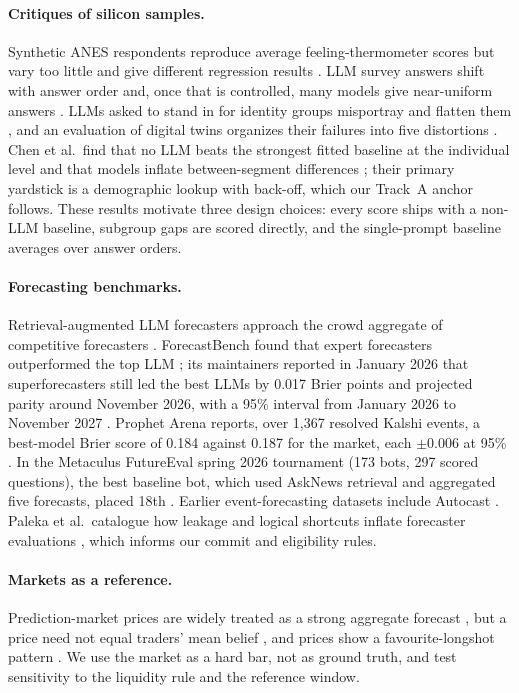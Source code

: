 \documentclass[11pt]{article}
\begin{document}
\paragraph{Critiques of silicon samples.} Synthetic ANES respondents reproduce average feeling-thermometer scores but vary too little and give different regression results \citep{bisbee2024synthetic}. LLM survey answers shift with answer order and, once that is controlled, many models give near-uniform answers \citep{dominguezolmedo2023questioning}. LLMs asked to stand in for identity groups misportray and flatten them \citep{wang2025flatten}, and an evaluation of digital twins organizes their failures into five distortions \citep{peng2025funhouse}. Chen et al.\ find that no LLM beats the strongest fitted baseline at the individual level and that models inflate between-segment differences \citep{chen2026synthetic}; their primary yardstick is a demographic lookup with back-off, which our Track~A anchor follows. These results motivate three design choices: every score ships with a non-LLM baseline, subgroup gaps are scored directly, and the single-prompt baseline averages over answer orders.

\paragraph{Forecasting benchmarks.} Retrieval-augmented LLM forecasters approach the crowd aggregate of competitive forecasters \citep{halawi2024approaching}. ForecastBench found that expert forecasters outperformed the top LLM \citep{karger2024forecastbench}; its maintainers reported in January 2026 that superforecasters still led the best LLMs by 0.017 Brier points and projected parity around November 2026, with a 95\% interval from January 2026 to November 2027 \citep{fri2026closing}. Prophet Arena reports, over 1{,}367 resolved Kalshi events, a best-model Brier score of 0.184 against 0.187 for the market, each $\pm 0.006$ at 95\% \citep{yang2025prophet}. In the Metaculus FutureEval spring 2026 tournament (173 bots, 297 scored questions), the best baseline bot, which used AskNews retrieval and aggregated five forecasts, placed 18th \citep{wilson2026futureeval}. Earlier event-forecasting datasets include Autocast \citep{zou2022autocast}. Paleka et al.\ catalogue how leakage and logical shortcuts inflate forecaster evaluations \citep{paleka2025pitfalls}, which informs our commit and eligibility rules.

\paragraph{Markets as a reference.} Prediction-market prices are widely treated as a strong aggregate forecast \citep{wolfers2004prediction}, but a price need not equal traders' mean belief \citep{manski2006interpreting}, and prices show a favourite-longshot pattern \citep{snowberg2010,page2013calibrated}. We use the market as a hard bar, not as ground truth, and test sensitivity to the liquidity rule and the reference window.
\end{document}
